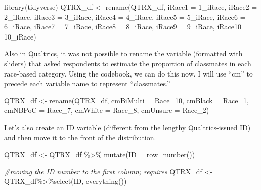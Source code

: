 \documentclass[
  english,
]{book}
\newenvironment{Shaded}{\begin{snugshade}}{\end{snugshade}}
\newcommand{\AttributeTok}[1]{\textcolor[rgb]{0.77,0.63,0.00}{#1}}
\newcommand{\CommentTok}[1]{\textcolor[rgb]{0.56,0.35,0.01}{\textit{#1}}}
\newcommand{\FunctionTok}[1]{\textcolor[rgb]{0.00,0.00,0.00}{#1}}
\newcommand{\NormalTok}[1]{#1}
\newcommand{\OtherTok}[1]{\textcolor[rgb]{0.56,0.35,0.01}{#1}}
\newcommand{\SpecialCharTok}[1]{\textcolor[rgb]{0.00,0.00,0.00}{#1}}
\newcommand{\StringTok}[1]{\textcolor[rgb]{0.31,0.60,0.02}{#1}}
\begin{document}
\begin{Shaded}
\begin{Highlighting}[]
\FunctionTok{library}\NormalTok{(tidyverse)}
\NormalTok{QTRX\_df }\OtherTok{\textless{}{-}} \FunctionTok{rename}\NormalTok{(QTRX\_df, }\AttributeTok{iRace1 =} \StringTok{\textquotesingle{}1\_iRace\textquotesingle{}}\NormalTok{, }\AttributeTok{iRace2 =} \StringTok{\textquotesingle{}2\_iRace\textquotesingle{}}\NormalTok{, }\AttributeTok{iRace3 =} \StringTok{\textquotesingle{}3\_iRace\textquotesingle{}}\NormalTok{, }\AttributeTok{iRace4 =} \StringTok{\textquotesingle{}4\_iRace\textquotesingle{}}\NormalTok{, }\AttributeTok{iRace5 =} \StringTok{\textquotesingle{}5\_iRace\textquotesingle{}}\NormalTok{, }\AttributeTok{iRace6 =} \StringTok{\textquotesingle{}6\_iRace\textquotesingle{}}\NormalTok{, }\AttributeTok{iRace7 =} \StringTok{\textquotesingle{}7\_iRace\textquotesingle{}}\NormalTok{, }\AttributeTok{iRace8 =} \StringTok{\textquotesingle{}8\_iRace\textquotesingle{}}\NormalTok{, }\AttributeTok{iRace9 =} \StringTok{\textquotesingle{}9\_iRace\textquotesingle{}}\NormalTok{, }\AttributeTok{iRace10 =} \StringTok{\textquotesingle{}10\_iRace\textquotesingle{}}\NormalTok{)}
\end{Highlighting}
\end{Shaded}

Also in Qualtrics, it was not possible to rename the variable (formatted with sliders) that asked respondents to estimate the proportion of classmates in each race-based category. Using the codebook, we can do this now. I will use ``cm'' to precede each variable name to represent ``classmates.''

\begin{Shaded}
\begin{Highlighting}[]
\NormalTok{QTRX\_df }\OtherTok{\textless{}{-}} \FunctionTok{rename}\NormalTok{(QTRX\_df, }\AttributeTok{cmBiMulti =}\NormalTok{ Race\_10, }\AttributeTok{cmBlack =}\NormalTok{ Race\_1, }\AttributeTok{cmNBPoC =}\NormalTok{ Race\_7, }\AttributeTok{cmWhite =}\NormalTok{ Race\_8, }\AttributeTok{cmUnsure =}\NormalTok{ Race\_2)}
\end{Highlighting}
\end{Shaded}

Let's also create an ID variable (different from the lengthy Qualtrics-issued ID) and then move it to the front of the distribution.

\begin{Shaded}
\begin{Highlighting}[]
\NormalTok{QTRX\_df }\OtherTok{\textless{}{-}}\NormalTok{ QTRX\_df }\SpecialCharTok{\%\textgreater{}\%} \FunctionTok{mutate}\NormalTok{(}\AttributeTok{ID =} \FunctionTok{row\_number}\NormalTok{())}

\CommentTok{\#moving the ID number to the first column; requires }
\NormalTok{QTRX\_df }\OtherTok{\textless{}{-}}\NormalTok{ QTRX\_df}\SpecialCharTok{\%\textgreater{}\%}\FunctionTok{select}\NormalTok{(ID, }\FunctionTok{everything}\NormalTok{())}
\end{Highlighting}
\end{Shaded}
\end{document}
